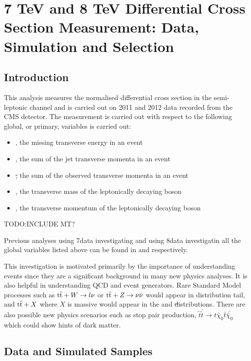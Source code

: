 \chapter{7 TeV and 8 TeV Differential Cross Section Measurement: Data, Simulation and Selection}
\label{c:Differential_Cross_Section:data_simulation_and_selection}

\section{Introduction}
\label{s:analysis1_introduction}
This analysis measures the normalised differential \ttbar cross section in the semi-leptonic channel and is
carried out on 2011 and 2012 data recorded from the CMS detector. The measurement is carried out with respect
to the following global, or primary, variables is carried out:
\begin {itemize}
  \item {\met, the missing transverse energy in an event}
  \item {\HT, the sum of the jet transverse momenta in an event}
  \item {\st, the sum of the observed transverse momenta in an event}
  \item {\mt, the transverse mass of the leptonically decaying \W boson}
  \item {\wpt, the transverse momentum of the leptonically decaying \W boson}
\end{itemize}

TODO:INCLUDE MT? %

Previous analyses using 7\TeV data investigating \met and using 8\TeV data investigatin all the
global variables listed above can be found in \cite{CMS-PAS-TOP-12-019} and \cite{CMS-PAS-TOP-12-042} respectively.

This investigation is motivated primarily by the importance of understanding \ttbar events since they are a
significant background in many new physics analyses. It is also helpful in understanding QCD and event
generators. Rare Standard Model processes such as $\mathrm{t}\overline{\mathrm{t}} + W\rightarrow l\nu$ or $\mathrm{t}\overline{\mathrm{t}} + Z\rightarrow
\nu\bar{\nu}$ would appear in \met distribution tail, and $\mathrm{t}\overline{\mathrm{t}} + X$ where $X$ is massive would appear in
the \HT and \st distributions. There are also possible new physics scenarios such as stop pair production,
$\tilde{t}\bar{\tilde{t}} \rightarrow t\tilde{\chi_0} \bar{t}\bar{\tilde{\chi_0}}$ which could show
hints of dark matter.

\section{Data and Simulated Samples}
\label{s:data_and_simulated_samples}

